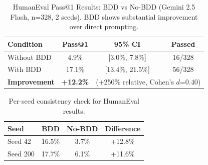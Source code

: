 \begin{table}[t]
\centering
\caption{HumanEval Pass@1 Results: BDD vs No-BDD (Gemini 2.5 Flash, n=328, 2 seeds). BDD shows substantial improvement over direct prompting.}\label{tab:humaneval}
\begin{tabular}{lccc}
\toprule
\textbf{Condition} & \textbf{Pass@1} & \textbf{95\% CI} & \textbf{Passed} \\
\midrule
Without BDD & 4.9\% & [3.0\%, 7.8\%] & 16/328 \\
With BDD & 17.1\% & [13.4\%, 21.5\%] & 56/328 \\
\midrule
\textbf{Improvement} & \textbf{+12.2\%} & \multicolumn{2}{c}{(+250\% relative, Cohen's $d$=0.40)} \\
\bottomrule
\end{tabular}
\end{table}

\begin{table}[t]
\centering
\caption{Per-seed consistency check for HumanEval results.}\label{tab:humaneval-seeds}
\begin{tabular}{lccc}
\toprule
\textbf{Seed} & \textbf{BDD} & \textbf{No-BDD} & \textbf{Difference} \\
\midrule
Seed 42 & 16.5\% & 3.7\% & +12.8\% \\
Seed 200 & 17.7\% & 6.1\% & +11.6\% \\
\bottomrule
\end{tabular}
\end{table}